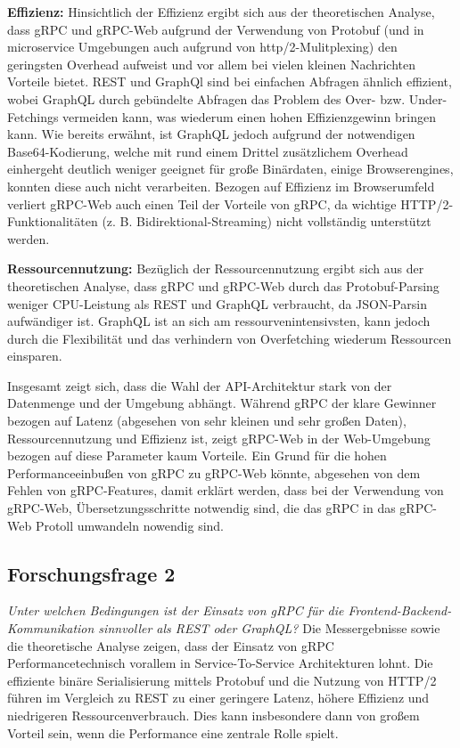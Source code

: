 \textbf{Effizienz:} 
Hinsichtlich der Effizienz ergibt sich aus der theoretischen Analyse, dass gRPC und gRPC-Web aufgrund der Verwendung von Protobuf (und in microservice Umgebungen auch aufgrund von http/2-Mulitplexing) den geringsten Overhead aufweist und vor allem bei vielen kleinen Nachrichten Vorteile bietet. REST und GraphQl sind bei einfachen Abfragen ähnlich effizient, wobei GraphQL durch gebündelte Abfragen das Problem des Over- bzw. Under-Fetchings vermeiden kann, was wiederum einen hohen Effizienzgewinn bringen kann. Wie bereits erwähnt, ist GraphQL jedoch aufgrund der notwendigen Base64-Kodierung, welche  mit rund einem Drittel zusätzlichem Overhead einhergeht deutlich weniger geeignet für große Binärdaten, einige Browserengines, konnten diese auch nicht verarbeiten. Bezogen auf Effizienz im Browserumfeld verliert gRPC-Web auch einen Teil der Vorteile von gRPC, da wichtige HTTP/2-Funktionalitäten (z. B. Bidirektional-Streaming) nicht vollständig unterstützt werden.

\textbf{Ressourcennutzung:} 
Bezüglich der Ressourcennutzung ergibt sich aus der theoretischen Analyse, dass gRPC und gRPC-Web durch das Protobuf-Parsing weniger CPU-Leistung als REST und GraphQL verbraucht, da JSON-Parsin aufwändiger ist. GraphQL ist an sich am ressourvenintensivsten, kann jedoch durch die Flexibilität und das verhindern von Overfetching wiederum Ressourcen einsparen.

Insgesamt zeigt sich, dass die Wahl der API-Architektur stark von der Datenmenge und der Umgebung abhängt. Während gRPC der klare Gewinner bezogen auf Latenz (abgesehen von sehr kleinen und sehr großen Daten), Ressourcennutzung und Effizienz ist, zeigt gRPC-Web in der Web-Umgebung bezogen auf diese Parameter kaum Vorteile. Ein Grund für die hohen Performanceeinbußen von gRPC zu gRPC-Web könnte, abgesehen von dem Fehlen von gRPC-Features, damit erklärt werden, dass bei der Verwendung von gRPC-Web, Übersetzungsschritte notwendig sind, die das gRPC in das gRPC-Web Protoll umwandeln nowendig sind.

\subsection*{Forschungsfrage 2}
\textit{Unter welchen Bedingungen ist der Einsatz von gRPC für die Frontend-Backend-Kommunikation sinnvoller als REST oder GraphQL?}
Die Messergebnisse sowie die theoretische Analyse zeigen, dass der Einsatz von gRPC Performancetechnisch vorallem in Service-To-Service Architekturen lohnt. Die effiziente binäre Serialisierung mittels Protobuf und die Nutzung von HTTP/2  führen im Vergleich zu REST zu einer geringere Latenz, höhere Effizienz und niedrigeren Ressourcenverbrauch. Dies kann insbesondere dann von großem Vorteil sein, wenn die Performance eine zentrale Rolle spielt.

